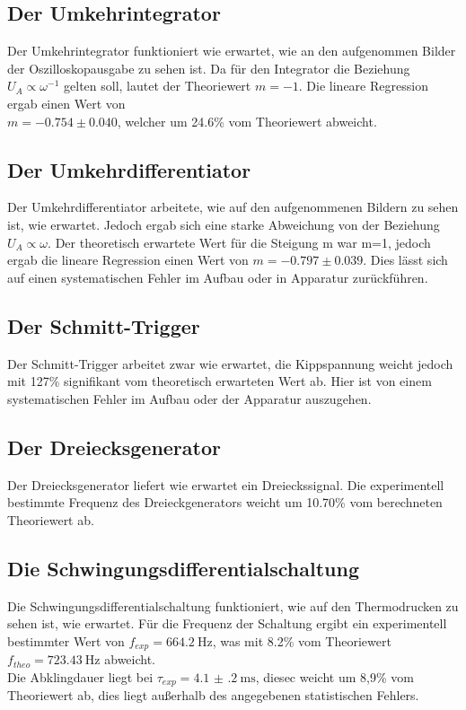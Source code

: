 \documentclass[]{scrartcl}
\begin{document}
\subsection{Der Umkehrintegrator}
Der Umkehrintegrator funktioniert wie erwartet, wie an den aufgenommen Bilder der Oszilloskopausgabe zu sehen ist. Da für den Integrator die Beziehung $U_A\propto\omega^{-1}$ gelten soll, lautet der Theoriewert $m=-1$. Die lineare Regression ergab einen Wert von  \\$m=-0.754\pm0.040$, welcher um 24.6\% vom Theoriewert abweicht.

\subsection{Der Umkehrdifferentiator}
Der Umkehrdifferentiator arbeitete, wie auf den aufgenommenen Bildern zu sehen ist, wie erwartet. Jedoch ergab sich eine starke Abweichung von der Beziehung $U_A\propto\omega$. Der theoretisch erwartete Wert für die Steigung m war m=1, jedoch ergab die lineare Regression einen Wert von $m = -0.797 \pm 0.039$. Dies lässt sich auf einen systematischen Fehler im Aufbau oder in Apparatur zurückführen.

\subsection{Der Schmitt-Trigger}
Der Schmitt-Trigger arbeitet zwar wie erwartet, die Kippspannung weicht jedoch mit 127\% signifikant vom theoretisch erwarteten Wert ab. Hier ist von einem systematischen Fehler im Aufbau oder der Apparatur auszugehen.

\subsection{Der Dreiecksgenerator}
Der Dreiecksgenerator liefert wie erwartet ein Dreieckssignal. Die experimentell \\bestimmte Frequenz des Dreieckgenerators weicht um 10.70\% vom berechneten Theoriewert ab.

\subsection{Die Schwingungsdifferentialschaltung}
Die Schwingungsdifferentialschaltung funktioniert, wie auf den Thermodrucken zu sehen ist, wie erwartet. Für die Frequenz der Schaltung ergibt ein experimentell bestimmter Wert von $f_{exp}=\SI{664.2}{\hertz}$, was mit 8.2\% vom Theoriewert $f_{theo}=\SI{723.43}{\hertz}$ abweicht. \\
Die Abklingdauer liegt bei $\tau_{exp}=\SI{4.1(2)}{\milli\second}$, diesec weicht um 8,9\% vom Theoriewert ab, dies liegt außerhalb des angegebenen statistischen Fehlers.
\end{document}
